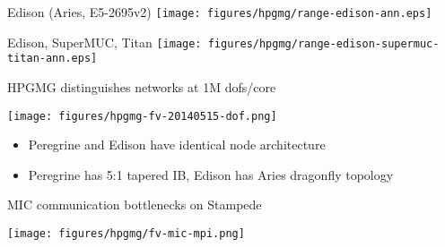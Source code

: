 \documentclass{beamer}
\begin{document}
\begin{frame}{Edison (Aries, E5-2695v2)}
  \texttt{[image: figures/hpgmg/range-edison-ann.eps]}
\end{frame}

\begin{frame}{Edison, SuperMUC, Titan}
  \texttt{[image: figures/hpgmg/range-edison-supermuc-titan-ann.eps]}
\end{frame}


\begin{frame}{HPGMG distinguishes networks at 1M dofs/core}
  \begin{center}
    \texttt{[image: figures/hpgmg-fv-20140515-dof.png]}
  \end{center}
  \begin{itemize}
  \item Peregrine and Edison have identical node architecture
  \item Peregrine has 5:1 tapered IB, Edison has Aries dragonfly topology
  \end{itemize}
\end{frame}

\begin{frame}{MIC communication bottlenecks on Stampede}
  \begin{center}
    \texttt{[image: figures/hpgmg/fv-mic-mpi.png]}
  \end{center}
\end{frame}
\end{document}
